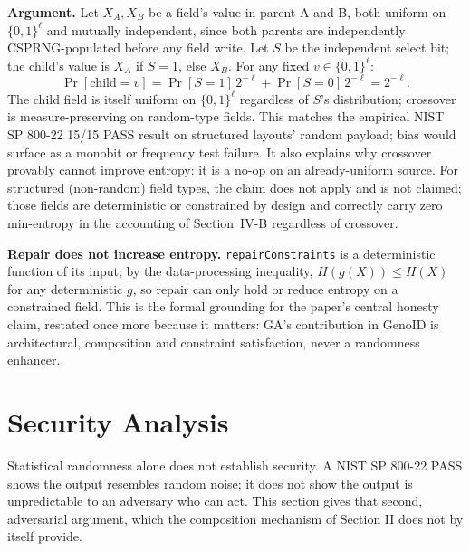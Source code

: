 \documentclass[conference]{IEEEtran}
\begin{document}
\textbf{Argument.} Let $X_A, X_B$ be a field's value in parent A and B, both uniform on $\{0,1\}^\ell$ and mutually independent, since both parents are independently CSPRNG-populated before any field write. Let $S$ be the independent select bit; the child's value is $X_A$ if $S=1$, else $X_B$. For any fixed $v \in \{0,1\}^\ell$:
\[
\Pr[\text{child} = v] = \Pr[S{=}1]\,2^{-\ell} + \Pr[S{=}0]\,2^{-\ell} = 2^{-\ell}.
\]
The child field is itself uniform on $\{0,1\}^\ell$ regardless of $S$'s distribution; crossover is measure-preserving on random-type fields. This matches the empirical NIST SP 800-22 15/15 PASS result on structured layouts' random payload; bias would surface as a monobit or frequency test failure. It also explains why crossover provably cannot improve entropy: it is a no-op on an already-uniform source. For structured (non-random) field types, the claim does not apply and is not claimed; those fields are deterministic or constrained by design and correctly carry zero min-entropy in the accounting of Section~IV-B regardless of crossover.

\textbf{Repair does not increase entropy.} \texttt{repairConstraints} is a deterministic function of its input; by the data-processing inequality, $H(g(X)) \leq H(X)$ for any deterministic $g$, so repair can only hold or reduce entropy on a constrained field. This is the formal grounding for the paper's central honesty claim, restated once more because it matters: GA's contribution in GenoID is architectural, composition and constraint satisfaction, never a randomness enhancer.

\section{Security Analysis}

Statistical randomness alone does not establish security. A NIST SP 800-22 PASS shows the output resembles random noise; it does not show the output is unpredictable to an adversary who can act. This section gives that second, adversarial argument, which the composition mechanism of Section II does not by itself provide.
\end{document}
